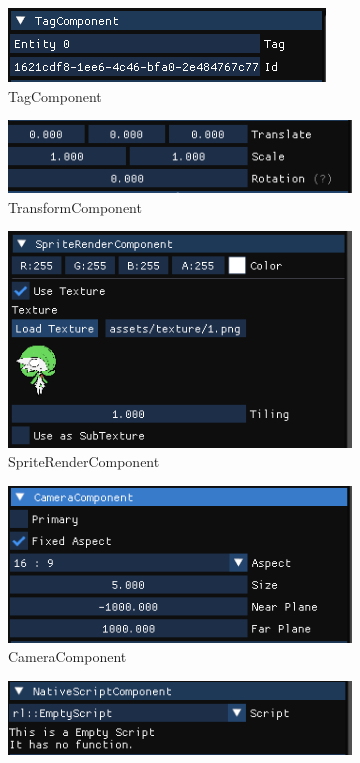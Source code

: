 \begin{figure}[h]
    \begin{subfigure}[b]{0.5\linewidth}
        \includegraphics[width=0.5\linewidth]{./resources/editor/ins_tag.png}
        \caption{TagComponent}
    \end{subfigure}
    \begin{subfigure}[b]{0.5\linewidth}
        \includegraphics[width=0.5\linewidth]{./resources/editor/ins_transform.png}
        \caption{TransformComponent}
    \end{subfigure}
    \begin{subfigure}[b]{0.5\linewidth}
        \includegraphics[width=0.5\linewidth]{./resources/editor/ins_render.png}
        \caption{SpriteRenderComponent}
    \end{subfigure}
    \begin{subfigure}[b]{0.5\linewidth}
        \includegraphics[width=0.5\linewidth]{./resources/editor/ins_camera.png}
        \caption{CameraComponent}
    \end{subfigure}
    \begin{subfigure}[b]{0.5\linewidth}
        \includegraphics[width=0.5\linewidth]{./resources/editor/ins_script.png}

\end{subfigure}
\end{figure}
